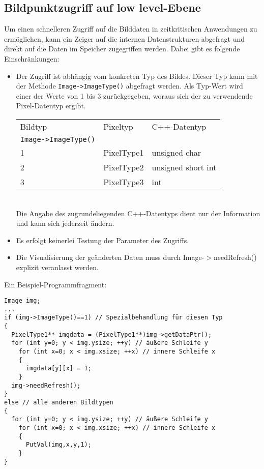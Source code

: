 \subsection{Bildpunktzugriff auf low level-Ebene}
\hypertarget{direct_pixel_access}{}
Um einen schnelleren Zugriff auf die Bilddaten in zeitkritischen Anwendungen
zu ermöglichen, kann ein Zeiger auf die internen Datenstrukturen abgefragt
und direkt auf die Daten im Speicher zugegriffen werden. Dabei gibt es
folgende Einschränkungen:
\begin{itemize}
\item Der Zugriff ist abhängig vom konkreten Typ des Bildes. Dieser Typ kann
  mit der Methode \verb+Image->ImageType()+ abgefragt werden. Als Typ-Wert wird 
  einer der Werte von 1 bis 3 zurückgegeben, woraus sich der zu verwendende
  Pixel-Datentyp ergibt.\\
\begin{tabular}{|l|l|l|} \hline
Bildtyp&Pixeltyp&C++-Datentyp\\
\verb+Image->ImageType()+ & & \\ \hline
1&PixelType1&unsigned char\\
2&PixelType2&unsigned short int\\
3&PixelType3&int\\ \hline
\end{tabular}\\
Die Angabe des zugrundeliegenden C++-Datentyps dient nur der Information 
und kann sich jederzeit ändern.
\item Es erfolgt keinerlei Testung der Parameter des Zugriffs.
\item Die Visualisierung der geänderten Daten muss durch
  Image-$>$needRefresh() explizit veranlasst werden.
\end{itemize}



Ein Beispiel-Programmfragment:
\begprogr
\begin{verbatim}
Image img;
... 
if (img->ImageType()==1) // Spezialbehandlung für diesen Typ
{
  PixelType1** imgdata = (PixelType1**)img->getDataPtr();
  for (int y=0; y < img.ysize; ++y) // äußere Schleife y
    for (int x=0; x < img.xsize; ++x) // innere Schleife x
    {
      imgdata[y][x] = 1;
    }
  img->needRefresh();
}
else // alle anderen Bildtypen
{
  for (int y=0; y < img.ysize; ++y) // äußere Schleife y
    for (int x=0; x < img.xsize; ++x) // innere Schleife x
    {
      PutVal(img,x,y,1);
    }
}
\end{verbatim}
\endprogr

